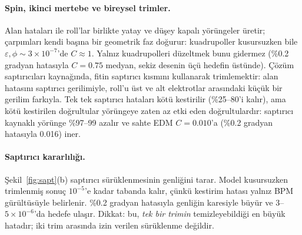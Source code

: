 \documentclass[11pt,a4paper]{article}
\begin{document}
\paragraph{Spin, ikinci mertebe ve bireysel trimler.} Alan hataları ile roll'lar birlikte yatay ve düşey kapalı
yörüngeler üretir; çarpımları kendi başına bir geometrik faz doğurur: kuadrupoller kusursuzken bile
$\varepsilon,\phi\sim3\times10^{-7}$'de $C\approx1$. Yalnız kuadrupolleri düzeltmek bunu gidermez (\%0.2 gradyan
hatasıyla $C=0.75$ medyan, sekiz desenin üçü hedefin üstünde). Çözüm saptırıcıları kaynağında, fitin saptırıcı
kısmını kullanarak trimlemektir: alan hatasını saptırıcı gerilimiyle, roll'u üst ve alt elektrotlar arasındaki
küçük bir gerilim farkıyla. Tek tek saptırıcı hataları kötü kestirilir (\%25--80'i kalır), ama kötü kestirilen
doğrultular yörüngeye zaten az etki eden doğrultulardır: saptırıcı kaynaklı yörünge \%97--99 azalır ve sahte EDM
$C=0.010$'a (\%0.2 gradyan hatasıyla 0.016) iner.
\EslestirilmisParagraf

\paragraph{Saptırıcı kararlılığı.} Şekil~\ref{fig:sapt}(b) saptırıcı sürüklenmesinin genliğini tarar. Model
kusursuzken trimlenmiş sonuç $10^{-5}$'e kadar tabanda kalır, çünkü kestirim hatası yalnız BPM gürültüsüyle
belirlenir. \%0.2 gradyan hatasıyla genliğin karesiyle büyür ve $3$--$5\times10^{-6}$'da hedefe ulaşır. Dikkat:
bu, \emph{tek bir trimin} temizleyebildiği en büyük hatadır; iki trim arasında izin verilen sürüklenme değildir.
\end{document}
